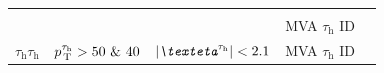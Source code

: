 \begin{table}[h]
\begin{tabular}{lllll}
                                      & \cellcolor{ctcolormain!20}{$p_\text{\,T}^{\tau_\text{h}} > \text{30}$ }  & \cellcolor{ctcolormain!20}{$\abs{\eta^{\tau_\text{h}}}<\text{2.3}$ } &                               \\
                                      & \cellcolor{ctcoloraccessory!20}{$20<p_\text{\,T}^\mu < \text{23}$            }  & \cellcolor{ctcoloraccessory!20}{$\abs{\eta^\mu}<\text{2.1}$              }  & \multirow{2}{*}{MVA  $\tau_\text{h}$ ID}   \\
                                      & \cellcolor{ctcoloraccessory!20}{$p_\text{\,T}^{\tau_\text{h}} > \text{15} $}  & \cellcolor{ctcoloraccessory!20}{$\abs{\eta^{\tau_\text{h}}}<\text{2.3}$}  &                               \\ \midrule  
$\tau_\text{h}\tau_\text{h}$          & $p_\text{\,T}^{\tau_\text{h}}>\text{50 \& 40}$ & $\abs{\eta^{\tau_\text{h}}}<\text{2.1}$  & MVA $\tau_\text{h}$ ID \\ \bottomrule                                
    \end{tabular}%
\end{table}%
